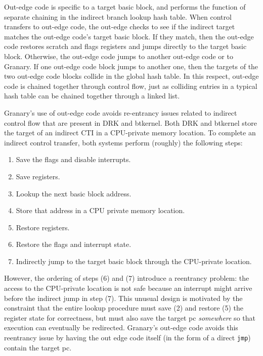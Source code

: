 \documentclass[preprint]{sigplanconf}
\begin{document}
Out-edge code is specific to a target basic block, and performs the function of separate chaining in the indirect branch lookup hash table. When control transfers to out-edge code, the out-edge checks to see if the indirect target matches the out-edge code's target basic block. If they match, then the out-edge code restores scratch and flags registers and jumps directly to the target basic block. Otherwise, the out-edge code jumps to another out-edge code or to Granary. If one out-edge code block jumps to another one, then the targets of the two out-edge code blocks collide in the global hash table. In this respect, out-edge code is chained together through control flow, just as colliding entries in a typical hash table can be chained together through a linked list.

Granary's use of out-edge code avoids re-entrancy issues related to indirect control flow that are present in DRK and btkernel. Both DRK and btkernel store the target of an indirect CTI in a CPU-private memory location. To complete an indirect control transfer, both systems perform (roughly) the following steps: \begin{enumerate}[itemindent=\parindent]%
\setlength{\itemsep}{2pt}%
\setlength{\parskip}{0pt}%
	\item Save the flags and disable interrupts.
	\item Save registers.
	\item Lookup the next basic block address.
	\item Store that address in a CPU private memory location.
	\item Restore registers.
	\item Restore the flags and interrupt state.
	\item Indirectly jump to the target basic block through the CPU-private location.
\end{enumerate} %
However, the ordering of steps (6) and (7) introduce a reentrancy problem: the access to the CPU-private location is not safe because an interrupt might arrive before the indirect jump in step (7). This unusual design is motivated by the constraint that the entire lookup procedure must save (2) and restore (5) the register state for correctness, but must also save the target pc \emph{somewhere} so that execution can eventually be redirected. Granary's out-edge code avoids this reentrancy issue by having the out edge code itself (in the form of a direct \texttt{jmp}) contain the target pc.

\end{document}
